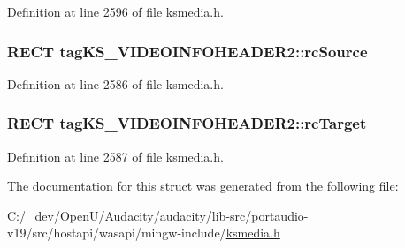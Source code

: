 Definition at line 2596 of file ksmedia.\+h.

\subsubsection[{\texorpdfstring{rc\+Source}{rcSource}}]{\setlength{\rightskip}{0pt plus 5cm}R\+E\+CT tag\+K\+S\+\_\+\+V\+I\+D\+E\+O\+I\+N\+F\+O\+H\+E\+A\+D\+E\+R2\+::rc\+Source}\hypertarget{structtag_k_s___v_i_d_e_o_i_n_f_o_h_e_a_d_e_r2_a5357001d271e6d7efac044d87bb543e1}{}\label{structtag_k_s___v_i_d_e_o_i_n_f_o_h_e_a_d_e_r2_a5357001d271e6d7efac044d87bb543e1}


Definition at line 2586 of file ksmedia.\+h.

\subsubsection[{\texorpdfstring{rc\+Target}{rcTarget}}]{\setlength{\rightskip}{0pt plus 5cm}R\+E\+CT tag\+K\+S\+\_\+\+V\+I\+D\+E\+O\+I\+N\+F\+O\+H\+E\+A\+D\+E\+R2\+::rc\+Target}\hypertarget{structtag_k_s___v_i_d_e_o_i_n_f_o_h_e_a_d_e_r2_adc53d58d66dd822a623bcb24153f7c57}{}\label{structtag_k_s___v_i_d_e_o_i_n_f_o_h_e_a_d_e_r2_adc53d58d66dd822a623bcb24153f7c57}


Definition at line 2587 of file ksmedia.\+h.



The documentation for this struct was generated from the following file\+:\begin{DoxyCompactItemize}
\item 
C\+:/\+\_\+dev/\+Open\+U/\+Audacity/audacity/lib-\/src/portaudio-\/v19/src/hostapi/wasapi/mingw-\/include/\hyperlink{ksmedia_8h}{ksmedia.\+h}\end{DoxyCompactItemize}
